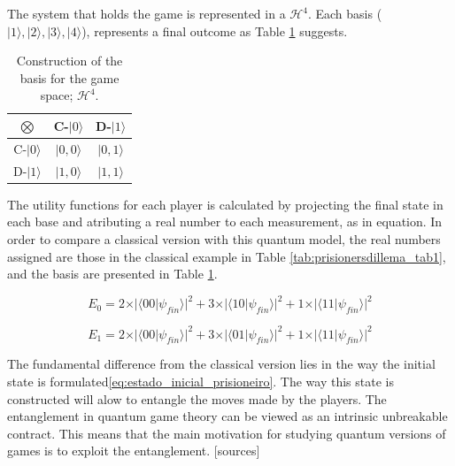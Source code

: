 The system that holds the game is represented in a $\mathcal{H}^{4}$. Each basis ($\vert 1\rangle, \vert 2\rangle, \vert 3\rangle, \vert 4\rangle$), represents a final outcome as Table \ref{tab:prisioners_m} suggests.

\begin{table}
\begin{centering}
\begin{tabular}{ccc}
\hline 
$\bigotimes$ & C-$\vert 0\rangle$ & D-$\vert 1\rangle$\tabularnewline
\hline 
C-$\vert 0\rangle$ & $\vert 0,0\rangle$ & $\vert 0,1\rangle$\tabularnewline
D-$\vert 1\rangle$ & $\vert 1,0\rangle$ & $\vert 1,1\rangle$\tabularnewline
\hline 
\end{tabular}
\par\end{centering}

\caption{Construction of the basis for the game space; $\mathcal{H}^{4}$.}
\label{tab:prisioners_m}
\end{table}

The utility functions for each player is calculated by projecting the final state in each base and atributing a real number to each measurement, as in equation.
In order to compare a classical version with this quantum model, the real numbers assigned are those in the classical example in Table \ref{tab:prisionersdillema_tab1}, and the basis are presented in Table \ref{tab:prisioners_m}.

\begin{equation}
E_{0}=2\times\vert\langle00\vert\psi_{fin}\rangle\vert^{2}+3\times\vert\langle10\vert\psi_{fin}\rangle\vert^{2}+1\times\vert\langle11\vert\psi_{fin}\rangle\vert^{2}
\end{equation}


\begin{equation}
E_{1}=2\times\vert\langle00\vert\psi_{fin}\rangle\vert^{2}+3\times\vert\langle01\vert\psi_{fin}\rangle\vert^{2}+1\times\vert\langle11\vert\psi_{fin}\rangle\vert^{2}
\end{equation}

The fundamental difference from the classical version lies in the way the initial state is formulated\ref{eq:estado_inicial_prisioneiro}. The way this state is constructed will alow to entangle the moves made by the players. The entanglement in quantum game theory can be viewed as an intrinsic unbreakable contract. This means that the main motivation for studying quantum versions of games is to exploit the entanglement. [sources]

